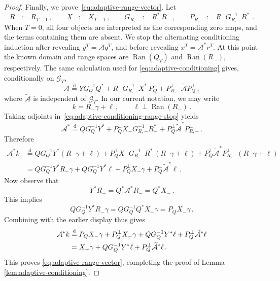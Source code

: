 \documentclass[11pt]{article}
\theoremstyle{definition}
\theoremstyle{remark}
\numberwithin{equation}{section}
\numberwithin{theorem}{section}
\newcommand{\cA}{\mathcal A}
\begin{document}
\begin{proof}
Finally, we prove~\eqref{eq:adaptive-range-vector}. Let
\[
 R_-:=R_{T-1}\,,\qquad X_-:=X_{T-1}\,,
 \qquad G_{R,-}:=R_-^*R_-\,,
 \qquad P_{R,-}:=R_-G_{R,-}^{-1}R_-^*\,.
\]
When $T=0$, all four objects are interpreted as the corresponding zero maps, and the terms containing them are absent. We stop the alternating conditioning induction after revealing $y^T=\cA q^T$, and before revealing $x^T=\cA^*r^T$.  At this point the known domain and range spaces are $\operatorname{Ran}(Q_T)$ and $\operatorname{Ran}(R_-)$, respectively. The same calculation used for \eqref{eq:adaptive-conditioning} gives, conditionally on $\mathscr G_T$,
\begin{equation}\label{eq:adaptive-conditioning-range-stop}
 \cA
 \stackrel{\mathrm d}{=}
 YG_Q^{-1}Q^*
 +R_-G_{R,-}^{-1}X_-^*P_Q^\perp
 +P_{R,-}^\perp\widetilde{\cA}P_Q^\perp\,,
\end{equation}
where $\widetilde{\cA}$ is independent of $\mathscr G_T$.  In our current notation, we may write
\[
  k=R_-\gamma+\ell\,, \qquad \ell\perp\operatorname{Ran}(R_-)\,.
\]
Taking adjoints in~\eqref{eq:adaptive-conditioning-range-stop} yields
\[
  \mathcal A^*
  \stackrel{\mathrm d}{=}
  QG_Q^{-1}Y^*
  +P_Q^\perp X_-G_{R,-}^{-1}R_-^*
  +P_Q^\perp\widetilde{\mathcal A}^*P_{R,-}^\perp\,.
\]
Therefore
\[
\begin{aligned}
  \mathcal A^*k
  &\stackrel{\mathrm d}{=}
  QG_Q^{-1}Y^*(R_-\gamma+\ell)
  +
  P_Q^\perp X_-G_{R,-}^{-1}R_-^*(R_-\gamma+\ell)
  +
  P_Q^\perp\widetilde{\mathcal A}^*P_{R,-}^\perp(R_-\gamma+\ell)  \\
  &=
  QG_Q^{-1}Y^*R_-\gamma
  +
  QG_Q^{-1}Y^*\ell
  +
  P_Q^\perp X_-\gamma
  +
  P_Q^\perp\widetilde{\mathcal A}^*\ell\,.
\end{aligned}
\]
Now observe that
\[
  Y^*R_-=Q^*\mathcal A^*R_-=Q^*X_-\,.
\]
This implies
\[
  QG_Q^{-1}Y^*R_-\gamma
  =
  QG_Q^{-1}Q^*X_-\gamma
  =
  P_QX_-\gamma\,.
\]
Combining with the earlier display thus gives
\begin{align}
\mathcal A^*k
  &\stackrel{\mathrm d}{=}
  P_QX_-\gamma
  +
  P_Q^\perp X_-\gamma
  +
  QG_Q^{-1}Y^*\ell
  +
  P_Q^\perp\widetilde{\mathcal A}^*\ell \notag \\
  &= X_-\gamma
  +
  QG_Q^{-1}Y^*\ell
  +
  P_Q^\perp\widetilde{\mathcal A}^*\ell\,. \notag
\end{align}
This proves \eqref{eq:adaptive-range-vector}, completing the proof of Lemma \ref{lem:adaptive-conditioning}.
\end{proof}
\end{document}
